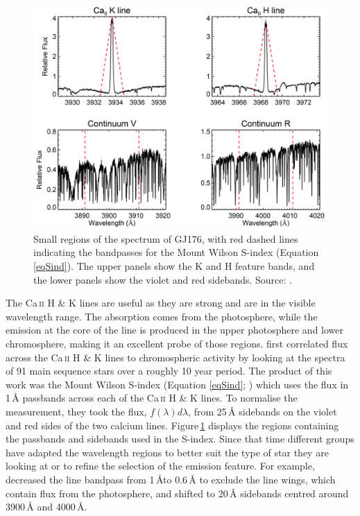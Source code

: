 \begin{figure}
    \includegraphics[scale=0.5]{MtWilson.png}
    \caption{Small regions of the spectrum of GJ176, with red dashed lines indicating the bandpasses for the Mount Wilson S-index (Equation\,\ref{eqSind}). The upper panels show the K and H feature bands, and the lower panels show the violet and red sidebands. Source: \citet{2015Suarez}.}
    \label{figLPVexample}
\end{figure}

The Ca\,\textsc{ii} H \& K lines are useful as they are strong and are in the visible wavelength range. The absorption comes from the photosphere, while the emission at the core of the line is produced in the upper photosphere and lower chromosphere, making it an excellent probe of those regions. \citet{1968Wilson} first correlated flux across the Ca\,\textsc{ii} H \& K lines to chromospheric activity by looking at the spectra of 91 main sequence stars over a roughly 10 year period. The product of this work was the Mount Wilson S-index (Equation \ref{eqSind}; \citealt{1978Vaughan}) which uses the flux in 1\,\hbox{\AA} passbands across each of the Ca\,\textsc{ii} H \& K lines. To normalise the measurement, they took the flux, $f(\lambda)d\lambda$, from 25\,\hbox{\AA} sidebands on the violet and red sides of the two calcium lines. Figure\,\ref{figLPVexample} displays the regions containing the passbands and sidebands used in the S-index. Since that time different groups have adapted the wavelength regions to better suit the type of star they are looking at or to refine the selection of the emission feature. For example, \citet{2011Gomes} decreased the line bandpass from 1\,\AA\:to 0.6\,\hbox{\AA} to exclude the line wings, which contain flux from the photosphere, and shifted to 20\,\hbox{\AA} sidebands centred around 3900\,\hbox{\AA} and 4000\,\hbox{\AA}.\\


